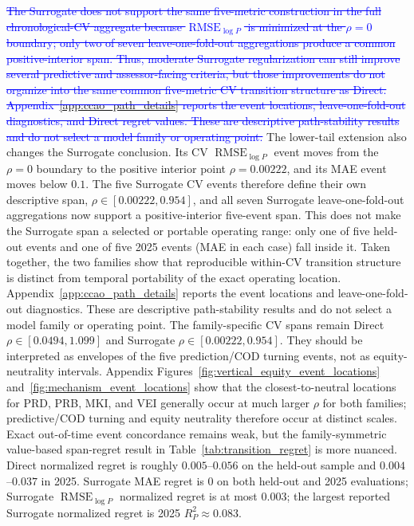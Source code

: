 \documentclass[10pt]{article}
\theoremstyle{definition}
\newcommand{\1}{\mathbf{1}}
\newcommand{\oldtext}[1]{\textcolor{blue}{\sout{#1}}}
\newcommand{\latesttext}[1]{\textcolor{latestPurple}{#1}}
\newenvironment{oldrevisionblock}{%
  \begingroup
  \begin{tcolorbox}[
    enhanced,breakable,
    colback=white,colframe=white,boxrule=0pt,
    left=0pt,right=0pt,top=1pt,bottom=1pt,
    coltext=blue,
    overlay unbroken={\draw[blue,line width=.45pt] (frame.south west)--(frame.north east);\draw[blue,line width=.45pt] (frame.north west)--(frame.south east);},
    overlay first={\draw[blue,line width=.45pt] (frame.south west)--(frame.north east);},
    overlay middle={\draw[blue,line width=.45pt] (frame.south west)--(frame.north east);},
    overlay last={\draw[blue,line width=.45pt] (frame.north west)--(frame.south east);}
  ]
}{\end{tcolorbox}\endgroup}
\begin{document}
\begin{oldrevisionblock}
\oldtext{The Surrogate does not support the same five-metric construction in the full chronological-CV aggregate because $\operatorname{RMSE}_{\log P}$ is minimized at the $\rho=0$ boundary; only two of seven leave-one-fold-out aggregations produce a common positive-interior span. Thus, moderate Surrogate regularization can still improve several predictive and assessor-facing criteria, but those improvements do not organize into the same common five-metric CV transition structure as Direct. Appendix~\ref{app:ccao_path_details} reports the event locations, leave-one-fold-out diagnostics, and Direct regret values. These are descriptive path-stability results and do not select a model family or operating point.}
\latesttext{The lower-tail extension also changes the Surrogate conclusion. Its CV $\operatorname{RMSE}_{\log P}$ event moves from the $\rho=0$ boundary to the positive interior point $\rho=0.00222$, and its MAE event moves below $0.1$. The five Surrogate CV events therefore define their own descriptive span, $\rho\in[0.00222,0.954]$, and all seven Surrogate leave-one-fold-out aggregations now support a positive-interior five-event span. This does not make the Surrogate span a selected or portable operating range: only one of five held-out events and one of five 2025 events (MAE in each case) fall inside it. Taken together, the two families show that reproducible within-CV transition structure is distinct from temporal portability of the exact operating location. Appendix~\ref{app:ccao_path_details} reports the event locations and leave-one-fold-out diagnostics. These are descriptive path-stability results and do not select a model family or operating point.}
\latesttext{The family-specific CV spans remain Direct $\rho\in[0.0494,1.099]$ and Surrogate $\rho\in[0.00222,0.954]$. They should be interpreted as envelopes of the five prediction/COD turning events, not as equity-neutrality intervals. Appendix Figures~\ref{fig:vertical_equity_event_locations} and~\ref{fig:mechanism_event_locations} show that the closest-to-neutral locations for PRD, PRB, MKI, and VEI generally occur at much larger $\rho$ for both families; predictive/COD turning and equity neutrality therefore occur at distinct scales. Exact out-of-time event concordance remains weak, but the family-symmetric value-based span-regret result in Table~\ref{tab:transition_regret} is more nuanced. Direct normalized regret is roughly $0.005$--$0.056$ on the held-out sample and $0.004$--$0.037$ in 2025. Surrogate MAE regret is $0$ on both held-out and 2025 evaluations; Surrogate $\operatorname{RMSE}_{\log P}$ normalized regret is at most $0.003$; the largest reported Surrogate normalized regret is 2025 $R^2_P\approx 0.083$.}

\end{oldrevisionblock}
\end{document}
